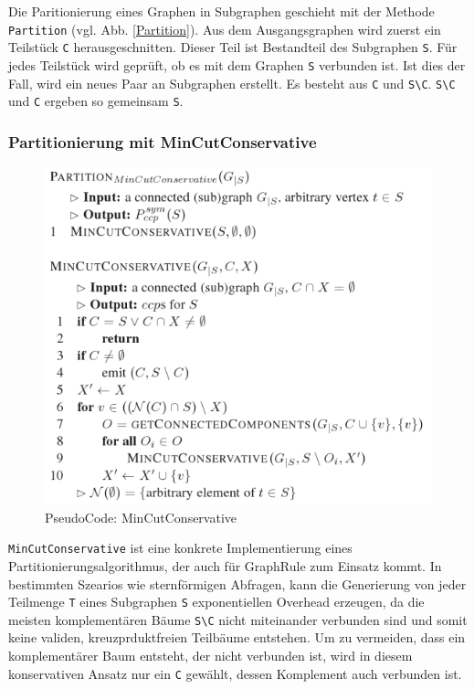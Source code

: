 Die Paritionierung eines Graphen in Subgraphen geschieht mit der Methode \texttt{Partition} (vgl. Abb. \ref{Partition}). Aus dem Ausgangsgraphen wird zuerst ein Teilstück \texttt{C} herausgeschnitten. Dieser Teil ist Bestandteil des Subgraphen \texttt{S}. Für jedes Teilstück wird geprüft, ob es mit dem Graphen \texttt{S} verbunden ist. Ist dies der Fall, wird ein neues Paar an Subgraphen erstellt. Es besteht aus \texttt{C} und  \texttt{S\textbackslash C}. \texttt{S\textbackslash C} und \texttt{C} ergeben so gemeinsam \texttt{S}.


\subsubsection{Partitionierung mit MinCutConservative}

\begin{figure}[ht]
  \centering
  \includegraphics[scale=0.5]{03_Regeln/00_media/MinCutConservative.png}
  \caption{PseudoCode: MinCutConservative}
  \label{MinCutConservative}
\end{figure}

\texttt{MinCutConservative} ist eine konkrete Implementierung eines Partitionierungsalgorithmus, der auch für GraphRule zum Einsatz kommt. In bestimmten Szearios wie sternförmigen Abfragen, kann die Generierung von jeder Teilmenge \texttt{T} eines Subgraphen \texttt{S} exponentiellen Overhead erzeugen, da die meisten komplementären Bäume \texttt{S\textbackslash C} nicht miteinander verbunden sind und somit keine validen, kreuzprduktfreien Teilbäume entstehen. Um zu vermeiden, dass ein komplementärer Baum entsteht, der nicht verbunden ist, wird in diesem konservativen Ansatz nur ein \texttt{C} gewählt, dessen Komplement auch verbunden ist. 







